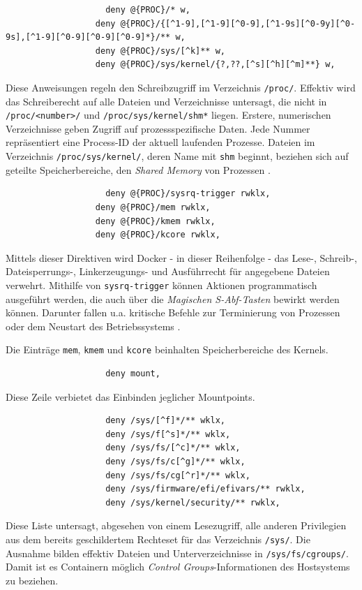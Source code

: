 \documentclass[../main.tex]{subfiles}
\begin{document}
{				\begin{lstlisting}
					deny @{PROC}/* w,
				  deny @{PROC}/{[^1-9],[^1-9][^0-9],[^1-9s][^0-9y][^0-9s],[^1-9][^0-9][^0-9][^0-9]*}/** w,
				  deny @{PROC}/sys/[^k]** w,
				  deny @{PROC}/sys/kernel/{?,??,[^s][^h][^m]**} w,
				\end{lstlisting}
				Diese Anweisungen regeln den Schreibzugriff im Verzeichnis \texttt{/proc/}. Effektiv wird das Schreiberecht auf alle Dateien und Verzeichnisse untersagt, die nicht in \texttt{/proc/<number>/} und \texttt{/proc/sys/kernel/shm*} liegen. Erstere, numerischen Verzeichnisse geben Zugriff auf prozessspezifische Daten. Jede Nummer repräsentiert eine Process-ID der aktuell laufenden Prozesse. Dateien im Verzeichnis \texttt{/proc/sys/kernel/}, deren Name mit \texttt{shm} beginnt, beziehen sich auf geteilte Speicherbereiche, den \emph{Shared Memory} von Prozessen \cite{apparmorShm}.

				\begin{lstlisting}
					deny @{PROC}/sysrq-trigger rwklx,
				  deny @{PROC}/mem rwklx,
				  deny @{PROC}/kmem rwklx,
				  deny @{PROC}/kcore rwklx,
				\end{lstlisting}
				Mittels dieser Direktiven wird Docker - in dieser Reihenfolge - das Lese-, Schreib-, Dateisperrungs-, Linkerzeugungs- und Ausführrecht für angegebene Dateien verwehrt. Mithilfe von \texttt{sysrq-trigger} können Aktionen programmatisch ausgeführt werden, die auch über die \emph{Magischen S-Abf-Tasten} bewirkt werden können. Darunter fallen u.a. kritische Befehle zur Terminierung von Prozessen oder dem Neustart des Betriebssystems \cite{apparmorMagicSysRQ}\cite{apparmorSysrqTrigger}.

				Die Einträge \texttt{mem}, \texttt{kmem} und \texttt{kcore} beinhalten Speicherbereiche des Kernels.

				\begin{lstlisting}
					deny mount,
				\end{lstlisting}
				Diese Zeile verbietet das Einbinden jeglicher Mountpoints.

				\begin{lstlisting}
					deny /sys/[^f]*/** wklx,
					deny /sys/f[^s]*/** wklx,
					deny /sys/fs/[^c]*/** wklx,
					deny /sys/fs/c[^g]*/** wklx,
					deny /sys/fs/cg[^r]*/** wklx,
					deny /sys/firmware/efi/efivars/** rwklx,
					deny /sys/kernel/security/** rwklx,
				\end{lstlisting}
				Diese Liste untersagt, abgesehen von einem Lesezugriff, alle anderen Privilegien aus dem bereits geschildertem Rechteset für das Verzeichnis \texttt{/sys/}. Die Ausnahme bilden effektiv Dateien und Unterverzeichnisse in \texttt{/sys/fs/cgroups/}. Damit ist es Containern möglich \emph{Control Groups}-Informationen des Hostsystems zu beziehen.

}
\end{document}
